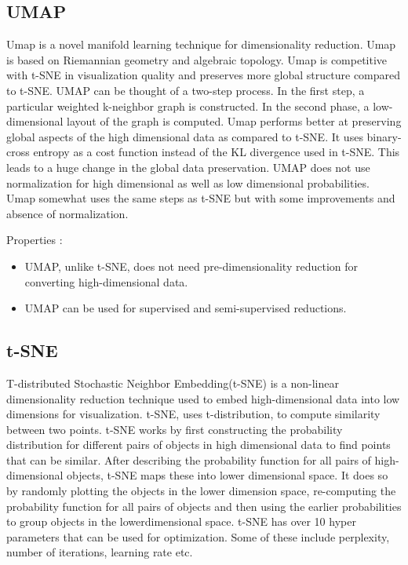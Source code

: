\documentclass[letterpaper, 10 pt, conference]{ieeeconf}  %
\begin{document}
\subsection{\textbf{UMAP}}
Umap is a novel manifold learning technique for dimensionality reduction. Umap is based on Riemannian
geometry and algebraic topology. Umap is competitive with t-SNE in visualization quality and preserves
more global structure compared to t-SNE. UMAP can be thought of a two-step process. In the first step, a
particular weighted k-neighbor graph is constructed. In the second phase, a low-dimensional layout of the
graph is computed. Umap performs better at preserving global aspects of the high dimensional data as
compared to t-SNE. It uses binary-cross entropy as a cost function instead of the KL divergence used in t-SNE. This leads to a huge change in the global data preservation. UMAP does not use normalization for
high dimensional as well as low dimensional probabilities. Umap somewhat uses the same steps as t-SNE
but with some improvements and absence of normalization.

Properties :
\begin{itemize}
	\item UMAP, unlike t-SNE, does not need pre-dimensionality reduction for converting high-dimensional
data.
	\item UMAP can be used for supervised and semi-supervised reductions.
\end{itemize}

\subsection{\textbf{t-SNE}}
T-distributed Stochastic Neighbor Embedding(t-SNE) is a non-linear dimensionality reduction technique
used to embed high-dimensional data into low dimensions for visualization. t-SNE, uses t-distribution, to
compute similarity between two points. t-SNE works by first constructing the probability distribution for
different pairs of objects in high dimensional data to find points that can be similar. After describing the
probability function for all pairs of high-dimensional objects, t-SNE maps these into lower dimensional space.
It does so by randomly plotting the objects in the lower dimension space, re-computing the probability
function for all pairs of objects and then using the earlier probabilities to group objects in the lowerdimensional
space. t-SNE has over 10 hyper parameters that can be used for optimization. Some of these
include perplexity, number of iterations, learning rate etc.
\end{document}
